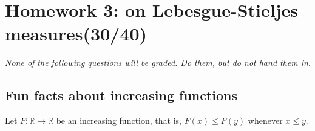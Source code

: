 \chapter{Homework 3: on Lebesgue-Stieljes measures(30/40)}\label{homework-3-on-lebesgue-stieljes-measures3040}

\emph{None of the following questions will be graded. Do them, but do not hand them in}.

\section{Fun facts about increasing functions}\label{fun-facts-about-increasing-functions}

Let \(F:\mathbb{R}\rightarrow\mathbb{R}\) be an increasing function, that is, \(F(x) \leq F(y)\) whenever \(x \leq y\).


